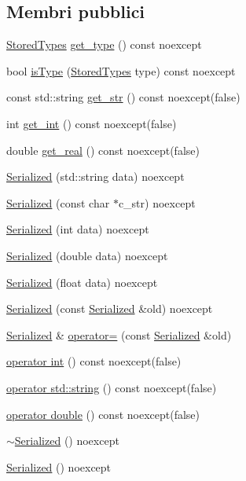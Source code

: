 \subsection*{Membri pubblici}
\begin{DoxyCompactItemize}
\item 
\hyperlink{namespacemm_ad5a796af6d7145f51e84a73ed35a601c}{Stored\+Types} \hyperlink{structmm_1_1_serialized_a9a257b31c4426077a3bd460d1e6cbd89}{get\+\_\+type} () const noexcept
\item 
bool \hyperlink{structmm_1_1_serialized_ac0e23433a34f0d326042907895a03353}{is\+Type} (\hyperlink{namespacemm_ad5a796af6d7145f51e84a73ed35a601c}{Stored\+Types} type) const noexcept
\item 
const std\+::string \hyperlink{structmm_1_1_serialized_aa3eb7eb50d6b343993c08a4d369af8b2}{get\+\_\+str} () const noexcept(false)
\item 
int \hyperlink{structmm_1_1_serialized_a259c2695619d6ba052fd8a3885a341ef}{get\+\_\+int} () const noexcept(false)
\item 
double \hyperlink{structmm_1_1_serialized_acd3c339c1766f6dbc0313669e7582361}{get\+\_\+real} () const noexcept(false)
\item 
\hyperlink{structmm_1_1_serialized_a440d7e6daeb9e6c2ca286a2eee1fc24d}{Serialized} (std\+::string data) noexcept
\item 
\hyperlink{structmm_1_1_serialized_a1fcb5290740858b4a800f6b4d48e3c74}{Serialized} (const char $\ast$c\+\_\+str) noexcept
\item 
\hyperlink{structmm_1_1_serialized_a2d29dc6d2cb8eed1a768a378b1d61b8f}{Serialized} (int data) noexcept
\item 
\hyperlink{structmm_1_1_serialized_ae11ee0c67ffaed5dfc69bf52f33ebcca}{Serialized} (double data) noexcept
\item 
\hyperlink{structmm_1_1_serialized_a8e5cff9af77398dfa1f398a83bb9d642}{Serialized} (float data) noexcept
\item 
\hyperlink{structmm_1_1_serialized_af64564defb439c3167375d2984c0653d}{Serialized} (const \hyperlink{structmm_1_1_serialized}{Serialized} \&old) noexcept
\item 
\hyperlink{structmm_1_1_serialized}{Serialized} \& \hyperlink{structmm_1_1_serialized_a7d108150308172857962c61c94f78fbd}{operator=} (const \hyperlink{structmm_1_1_serialized}{Serialized} \&old)
\item 
\hyperlink{structmm_1_1_serialized_a47c193b8439645264f62af1887cbfb2f}{operator int} () const noexcept(false)
\item 
\hyperlink{structmm_1_1_serialized_a4c753eedf42e36e51e8de52c2ae8917d}{operator std\+::string} () const noexcept(false)
\item 
\hyperlink{structmm_1_1_serialized_a3462f388a68a546a738038e5ce235b21}{operator double} () const noexcept(false)
\item 
\hyperlink{structmm_1_1_serialized_af1414a72ff10e038d96f6f33f352b2dc}{$\sim$\+Serialized} () noexcept
\item 
\hyperlink{structmm_1_1_serialized_a14f147b31fbf90a95379bbd919875362}{Serialized} () noexcept
\end{DoxyCompactItemize}
